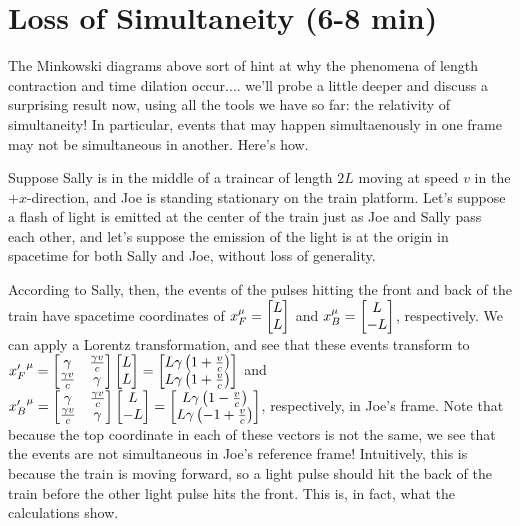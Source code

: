 \documentclass[12pt]{scrartcl}
\begin{document}
\section{Loss of Simultaneity (6-8 min)}
The Minkowski diagrams above sort of hint at why the phenomena of length contraction and time dilation occur.... we'll probe a little deeper and discuss a surprising result now, using all the tools we have so far: the relativity of simultaneity! In particular, events that may happen simultaenously in one frame may not be simultaneous in another. Here's how.

Suppose Sally is in the middle of a traincar of length $2L$ moving at speed $v$ in the $+x$-direction, and Joe is standing stationary on the train platform. Let's suppose a flash of light is emitted at the center of the train just as Joe and Sally pass each other, and let's suppose the emission of the light is at the origin in spacetime for both Sally and Joe, without loss of generality.

According to Sally, then, the events of the pulses hitting the front and back of the train have spacetime coordinates of $x_F^\mu = \begin{bmatrix}L \\ L\end{bmatrix}$ and $x_B^\mu = \begin{bmatrix}L \\ -L\end{bmatrix}$, respectively. We can apply a Lorentz transformation, and see that these events transform to ${x'_F}^\mu = \begin{bmatrix}\gamma & \frac{\gamma v}{c} \\ \frac{\gamma v}{c} & \gamma\end{bmatrix}  \begin{bmatrix}L \\ L\end{bmatrix} =
	\begin{bmatrix}L\gamma\left(1+\frac{v}{c}\right) \\ L\gamma\left(1+\frac{v}{c}\right)\end{bmatrix}$ and
${x'_B}^\mu = \begin{bmatrix}\gamma & \frac{\gamma v}{c} \\ \frac{\gamma v}{c} & \gamma\end{bmatrix}  \begin{bmatrix}L \\ -L\end{bmatrix} = \begin{bmatrix}L\gamma\left(1-\frac{v}{c}\right) \\ L\gamma\left(-1+\frac{v}{c}\right)\end{bmatrix}$, respectively, in Joe's frame. Note that because the top coordinate in each of these vectors is not the same, we see that the events are not simultaneous in Joe's reference frame! Intuitively, this is because the train is moving forward, so a light pulse should hit the back of the train  before the other light pulse hits the front. This is, in fact, what the calculations show.
\end{document}
